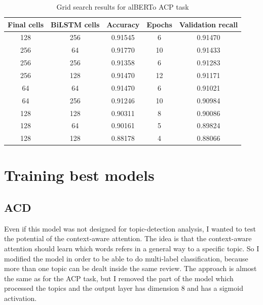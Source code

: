 \documentclass{article}
\begin{document}
            \begin{table}[h!]
                \begin{center}
                \caption{Grid search results for alBERTo ACP task}
                \label{tab:table3}
                \begin{tabular}{c|c|c|c|c}
                    \textbf{Final cells} & \textbf{BiLSTM cells} & \textbf{Accuracy} & \textbf{Epochs} & \textbf{Validation recall}\\
                    \hline
                        128 & 256 & 0.91545 & 6  & 0.91470\\
                        256 & 64  & 0.91770 & 10 & 0.91433\\
                        256 & 256 & 0.91358 & 6  & 0.91283\\
                        256 & 128 & 0.91470 & 12 & 0.91171\\
                        64  & 64  & 0.91470 & 6  & 0.91021\\
                        64  & 256 & 0.91246 & 10 & 0.90984\\
                        128 & 128 & 0.90311 & 8  & 0.90086\\
                        128 & 64  & 0.90161 & 5  & 0.89824\\
                        128 & 128 & 0.88178 & 4  & 0.88066\\
                \end{tabular}
                \end{center}
            \end{table}


    \section{Training best models}\label{sec:training-best-models}
            \subsection{ACD}\label{subsec:s2}
            Even if this model was not designed for topic-detection analysis, I wanted to test the potential of the context-aware attention.
            The idea is that the context-aware attention should learn which words refers in a general way to a specific topic.
            So I modified the model in order to be able to do multi-label classification, because more than one topic can be dealt inside the same review.
            The approach is almost the same as for the ACP task, but I removed the part of the model which processed the topics and the output layer has dimension 8 and has a sigmoid activation.
\end{document}
